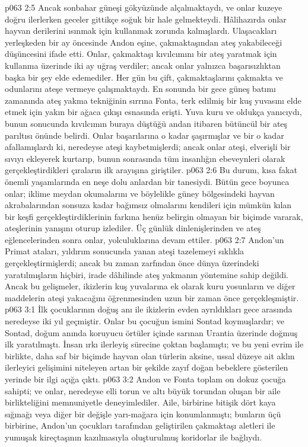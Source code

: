 \vs p063 2:5 Ancak sonbahar güneşi gökyüzünde alçalmaktaydı, ve onlar kuzeye doğru ilerlerken geceler gittikçe soğuk bir hale gelmekteydi. Hâlihazırda onlar hayvan derilerini ısınmak için kullanmak zorunda kalmışlardı. Ulaşacakları yerleşkeden bir ay öncesinde Andon eşine, çakmaktaşından ateş yakabileceği düşüncesini ifade etti. Onlar, çakmaktaşı kıvılcımını bir ateş yaratmak için kullanma üzerinde iki ay uğraş verdiler; ancak onlar yalnızca başarısızlıktan başka bir şey elde edemediler. Her gün bu çift, çakmaktaşlarını çakmakta ve odunlarını ateşe vermeye çalışmaktaydı. En sonunda bir gece güneş batımı zamanında ateş yakma tekniğinin sırrına Fonta, terk edilmiş bir kuş yuvasını elde etmek için yakın bir ağaca çıkışı esnasında erişti. Yuva kuru ve oldukça yanıcıydı, bunun sonucunda kıvılcımın buraya düştüğü andan itibaren bütüncül bir ateş parıltısı önünde belirdi. Onlar başarılarına o kadar şaşırmışlar ve bir o kadar afallamışlardı ki, neredeyse ateşi kaybetmişlerdi; ancak onlar ateşi, elverişli bir sıvıyı ekleyerek kurtarıp, bunun sonrasında tüm insanlığın ebeveynleri olarak gerçekleştirdikleri çıraların ilk arayışına giriştiler.
\vs p063 2:6 Bu durum, kısa fakat önemli yaşamlarında en neşe dolu anlardan bir tanesiydi. Bütün gece boyunca onlar; iklime meydan okumalarını ve böylelikle güney bölgesindeki hayvan akrabalarından sonsuza kadar bağımsız olmalarını kendileri için mümkün kılan bir keşfi gerçekleştirdiklerinin farkına henüz belirgin olmayan bir biçimde vararak, ateşlerinin yanışını oturup izlediler. Üç günlük dinlenişlerinden ve ateş eğlencelerinden sonra onlar, yolculuklarına devam ettiler.
\vs p063 2:7 Andon’un Primat ataları, yıldırım sonucunda yanan ateşi tazelemeyi sıklıkla gerçekleştirmişlerdi; ancak bu zaman zarfından önce dünya üzerindeki yaratılmışların hiçbiri, irade dâhilinde ateş yakmanın yöntemine sahip değildi. Ancak bu gelişmeler, ikizlerin kuş yuvalarına ek olarak kuru yosunların ve diğer maddelerin ateşi yakacağını öğrenmesinden uzun bir zaman önce gerçekleşmiştir.
\vs p063 3:1 İlk çocuklarının doğuş anı ile ikizlerin evden ayrıldıkları gece arasında neredeyse iki yıl geçmiştir. Onlar bu çocuğun ismini Sontad koymuşlardır; ve Sontad, doğum anında koruyucu örtüler içinde sarınan Urantia üzerinde doğmuş ilk yaratılmıştı. İnsan ırkı ilerleyiş sürecine çoktan başlamıştı; ve bu yeni evrim ile birlikte, daha saf bir biçimde hayvan olan türlerin aksine, ussal düzeye ait aklın ilerleyici gelişimini niteleyen artan bir şekilde zayıf doğan bebeklere gösterilen yerinde bir ilgi açığa çıktı.
\vs p063 3:2 Andon ve Fonta toplam on dokuz çocuğa sahipti; ve onlar, neredeyse elli torun ve altı büyük torundan oluşan bir aile birlikteliğini memnuniyetle deneyimlediler. Aile, birbirine bitişik dört kaya sığınağı veya diğer bir değişle yarı\hyp{}mağara için konumlanmıştı; bunların üçü birbirine, Andon’un çocukları tarafından geliştirilen çakmaktaşı aletleri ile yumuşak kireçtaşının kazılmasıyla oluşturulmuş koridorlar ile bağlıydı.
